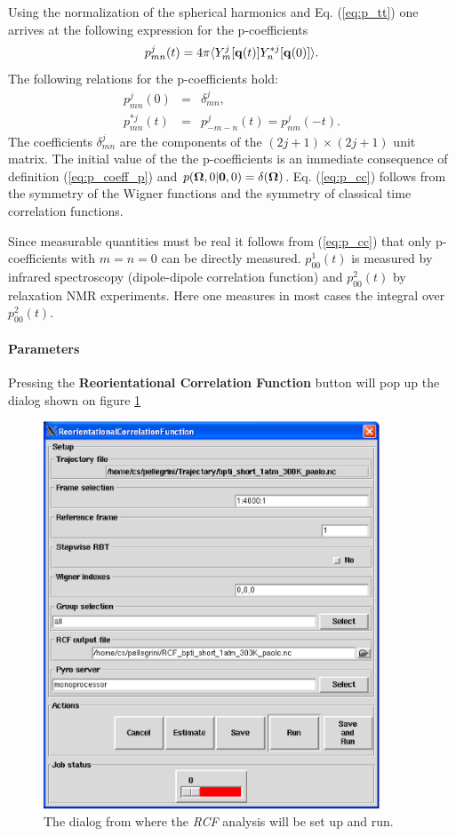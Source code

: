 \documentclass[a4paper,11pt]{report}
\begin{document}
Using the normalization of the spherical harmonics  and Eq.
(\ref{eq:p_tt}) one arrives at the following expression
for the p-coefficients
\begin{equation}
\label{p_jmn_y}
p^j_{m n}(t) = 4\pi \langle Y^j_m[{\bf q}(t)]Y^{* j}_n[{\bf q}(0)]\rangle.
\end{equation}
The following relations for the p-coefficients hold:
\begin{eqnarray}
\label{eq:p_initial}
p^j_{m n}(0)     &= &\delta^j_{mn},\\
\label{eq:p_cc}
p^{* j}_{m n}(t) &= &p^{j}_{-m -n}(t) = p^j_{n m}(-t).
\end{eqnarray}
The coefficients $\delta^j_{mn}$ are the components of the $(2j + 1)\times(2j + 1)$ unit matrix. The initial value of the 
the p-coefficients is an immediate consequence of definition (\ref{eq:p_coeff_p}) and 
$p({\bf\Omega},0|{\bf 0},0) = \delta({\bf\Omega})$. Eq. (\ref{eq:p_cc}) follows from the symmetry of the Wigner functions 
and the symmetry of classical time correlation functions. 

Since measurable quantities must be real it follows from (\ref{eq:p_cc}) that only p-coefficients with $m = n = 0$ can be
directly measured. $p^1_{0 0}(t)$ is measured by infrared spectroscopy (dipole-dipole correlation function) and 
$p^2_{0 0}(t)$ by relaxation NMR experiments. Here one measures in most cases the integral over $p^2_{0 0}(t)$.
\newpage
\paragraph{Parameters\\}
\label{rcf_parameters}
Pressing the \textbf{Reorientational Correlation Function} button will pop up the dialog shown on figure \ref{fig:rcf}
\begin{figure}[h!]
\begin{center}
\includegraphics[width=10cm]{Figures/rcf.eps}
\end{center}
\caption[The \textit{RCF} analysis dialog]{The dialog from where the \textit{RCF} analysis will be set up and run.}
\label{fig:rcf}
\end{figure}   
\end{document}
